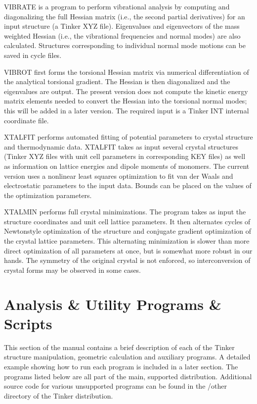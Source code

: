 \documentclass[letterpaper,11pt,english]{sphinxmanual}
\begin{document}
\sphinxAtStartPar
{}

\sphinxAtStartPar
VIBRATE is a program to perform vibrational analysis by computing and diagonalizing the full Hessian matrix (i.e., the second partial derivatives) for an input structure (a Tinker XYZ file). Eigenvalues and eigenvectors of the mass weighted Hessian (i.e., the vibrational frequencies and normal modes) are also calculated. Structures corresponding to individual normal mode motions can be saved in cycle files.

\sphinxAtStartPar
{}

\sphinxAtStartPar
VIBROT first forms the torsional Hessian matrix via numerical differentiation of the analytical torsional gradient. The Hessian is then diagonalized and the eigenvalues are output. The present version does not compute the kinetic energy matrix elements needed to convert the Hessian into the torsional normal modes; this will be added in a later version. The required input is a Tinker INT internal coordinate file.

\sphinxAtStartPar
{}

\sphinxAtStartPar
XTALFIT performs automated fitting of potential parameters to crystal structure and thermodynamic data. XTALFIT takes as input several crystal structures (Tinker XYZ files with unit cell parameters in corresponding KEY files) as well as information on lattice energies and dipole moments of monomers. The current version uses a nonlinear least squares optimization to fit van der Waals and electrostatic parameters to the input data. Bounds can be placed on the values of the optimization parameters.

\sphinxAtStartPar
{}

\sphinxAtStartPar
XTALMIN performs full crystal minimizations. The program takes as input the structure coordinates and unit cell lattice parameters. It then alternates cycles of Newton\sphinxhyphen{}style optimization of the structure and conjugate gradient optimization of the crystal lattice parameters. This alternating minimization is slower than more direct optimization of all parameters at once, but is somewhat more robust in our hands. The symmetry of the original crystal is not enforced, so interconversion of crystal forms may be observed in some cases.

\sphinxstepscope


\chapter{Analysis \& Utility Programs \& Scripts}
\label{\detokenize{text/analysis-programs:analysis-utility-programs-scripts}}\label{\detokenize{text/analysis-programs::doc}}
\sphinxAtStartPar
This section of the manual contains a brief description of each of the Tinker structure manipulation, geometric calculation and auxiliary programs. A detailed example showing how to run each program is included in a later section. The programs listed below are all part of the main, supported distribution. Additional source code for various unsupported programs can be found in the /other directory of the Tinker distribution.
\end{document}
